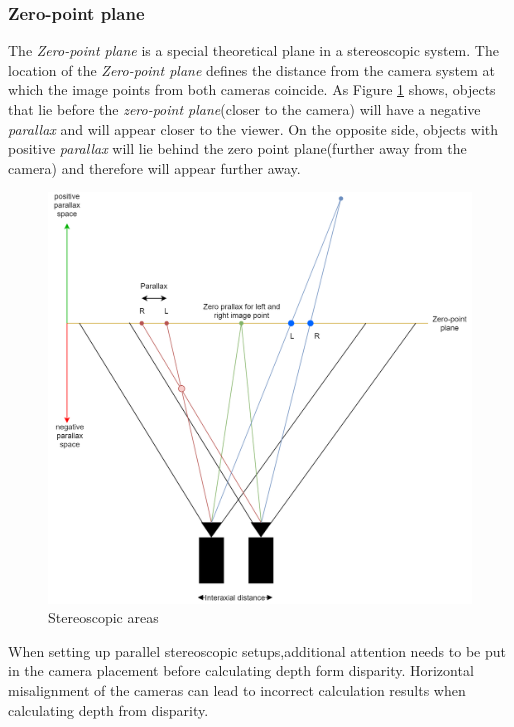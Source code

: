 \subsubsection{Zero-point plane}
The\textit{ Zero-point plane} is a special theoretical plane in a stereoscopic system. The location of the \textit{Zero-point plane} defines the distance from the camera system at which the image points from both cameras coincide. As Figure \ref{img:stereo_diagram} shows, objects that lie before the \textit{zero-point plane}(closer to the camera) will have a negative \textit{parallax} and will appear closer to the viewer. On the opposite side, objects with positive \textit{parallax} will lie behind the zero point plane(further away from the camera) and therefore will appear further away.
\begin{figure}[H]
\includegraphics[width=\textwidth]{images/Stereo_diagram.png}
\caption{Stereoscopic areas}
\label{img:stereo_diagram} 
\end{figure}
When setting up parallel stereoscopic setups,additional attention needs to be put in the camera placement before calculating depth form disparity. Horizontal misalignment of the cameras can lead to incorrect calculation results when calculating depth from disparity.
